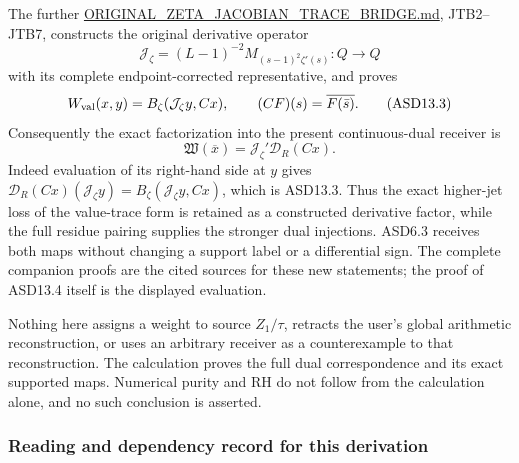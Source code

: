 The further \url{ORIGINAL_ZETA_JACOBIAN_TRACE_BRIDGE.md}, JTB2--JTB7,
constructs the original derivative operator \[
 \mathcal J_\zeta=(L-1)^{-2}
       M_{(s-1)^2\zeta'(s)}:Q\to Q
\] with its complete endpoint-corrected representative, and proves \[
 W_{\rm val}(x,y)=B_\zeta(\mathcal J_\zeta y,Cx),
 \qquad (CF)(s)=\overline{F(\bar s)}.
 \tag{ASD13.3}
\] Consequently the exact factorization into the present continuous-dual
receiver is \[
 \mathfrak W(\overline x)
   =\mathcal J_\zeta'\mathcal D_R(Cx).
 \tag{ASD13.4}
\] Indeed evaluation of its right-hand side at \(y\) gives
\(\mathcal D_R(Cx)(\mathcal J_\zeta y)
=B_\zeta(\mathcal J_\zeta y,Cx)\), which is ASD13.3. Thus the exact
higher-jet loss of the value-trace form is retained as a constructed
derivative factor, while the full residue pairing supplies the stronger
dual injections. ASD6.3 receives both maps without changing a support
label or a differential sign. The complete companion proofs are the
cited sources for these new statements; the proof of ASD13.4 itself is
the displayed evaluation.

Nothing here assigns a weight to source \(Z_1/\tau\), retracts the
user's global arithmetic reconstruction, or uses an arbitrary receiver
as a counterexample to that reconstruction. The calculation proves the
full dual correspondence and its exact supported maps. Numerical purity
and RH do not follow from the calculation alone, and no such conclusion
is asserted.

\subsubsection{Reading and dependency record for this
derivation}\label{reading-and-dependency-record-for-this-derivation}

